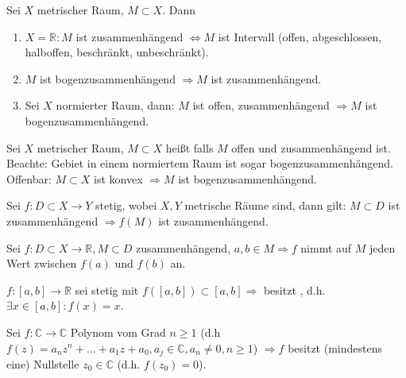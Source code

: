 \addtocounter{theorem}{1}
\begin{proposition}
    Sei $X$ metrischer Raum, $M \subset X$. Dann
    \begin{enumerate}[label={\arabic*)}]
    \item $X = \mathbb{R}: M$ ist zusammenhängend $\Leftrightarrow M$ ist Intervall (offen, abgeschlossen, halboffen, beschränkt, unbeschränkt).
    \item $M$ ist bogenzusammenhängend $\Rightarrow M$ ist zusammenhängend.
    \item Sei $X$ normierter Raum, dann: $M$ ist offen, zusammenhängend $\Rightarrow M$ ist bogenzusammenhängend.
    \end{enumerate}
\end{proposition}

\begin{definition}
    Sei $X$ metrischer Raum, $M \subset X$ heißt  falls $M$ offen und zusammenhängend ist.\\
    Beachte: Gebiet in einem normiertem Raum ist sogar bogenzusammenhängend.\\
    Offenbar: $M \subset X$ ist konvex $\Rightarrow M$ ist bogenzusammenhängend.
\end{definition}

\begin{proposition}
    Sei $f: D\subset X\to Y$ stetig, wobei $X,Y$ metrische Räume sind, dann gilt: $M \subset D$ ist zusammenhängend $\Rightarrow f(M)$ ist zusammenhängend.
\end{proposition}

\begin{theorem}
	 
    Sei $f: D \subset X \to \mathbb{R}, M \subset D$ zusammenhängend, $a,b \in M \Rightarrow f$ nimmt auf $M$ jeden Wert zwischen $f(a)$ und $f(b)$ an.
\end{theorem}

\addtocounter{theorem}{1}

\begin{example}
    $f:[a,b] \to \mathbb{R}$ sei stetig mit $f([a,b]) \subset [a,b] \Rightarrow$ besitzt , d.h. $\exists x \in [a,b]\colon f(x)=x$.
\end{example}

\begin{theorem}\label{Fundam_algebra}
    Sei $f: \mathbb{C} \to \mathbb{C}$ Polynom vom Grad $n\geq 1$ (d.h $f(z) = a_n z^n + \dots + a_1 z + a_0,a_j \in \mathbb{C}, a_n \neq 0, n\geq 1$) $\Rightarrow f$ besitzt (mindestens eine) Nullstelle $z_0 \in \mathbb{C}$ (d.h. $f(z_0) = 0$).
\end{theorem}

